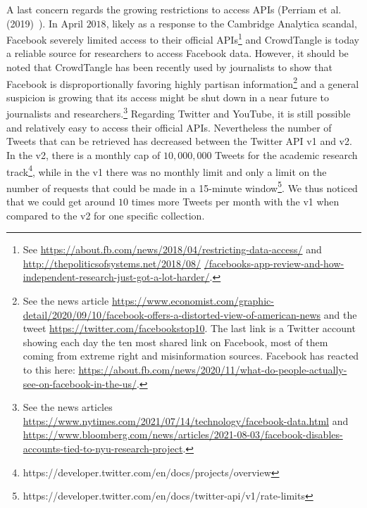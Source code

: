 \documentclass{article}
\begin{document}
A last concern regards the growing restrictions to access APIs (Perriam et al.(2019)~\cite{api}).
In April $2018$, likely as a response to the Cambridge Analytica scandal, Facebook severely limited access to their official APIs\footnote{See \href{https://about.fb.com/news/2018/04/restricting-data-access/}{https://about.fb.com/news/2018/04/restricting-data-access/} and \href{http://thepoliticsofsystems.net/2018/08/facebooks-app-review-and-how-independent-research-just-got-a-lot-harder/}{http://thepoliticsofsystems.net/2018/08/} \href{http://thepoliticsofsystems.net/2018/08/facebooks-app-review-and-how-independent-research-just-got-a-lot-harder/}{/facebooks-app-review-and-how-independent-research-just-got-a-lot-harder/}.} 
and CrowdTangle is today a reliable source for researchers to access Facebook data. 
However, it should be noted that CrowdTangle has been recently used by journalists to show that Facebook is disproportionally favoring highly partisan information\footnote{See the news article \href{https://www.economist.com/graphic-detail/2020/09/10/facebook-offers-a-distorted-view-of-american-news}{https://www.economist.com/graphic-detail/2020/09/10/facebook-offers-a-distorted-view-of-american-news} and the tweet \href{https://twitter.com/facebookstop10}{https://twitter.com/facebookstop10}. 
The last link is a Twitter account showing each day the ten most shared link on Facebook, most of them coming from extreme right and misinformation sources. 
Facebook has reacted to this here: \href{https://about.fb.com/news/2020/11/what-do-people-actually-see-on-facebook-in-the-us/}{https://about.fb.com/news/2020/11/what-do-people-actually-see-on-facebook-in-the-us/}.} 
and a general suspicion is growing that its access might be shut down in a near future to journalists and researchers.\footnote{See the news articles \href{https://www.nytimes.com/2021/07/14/technology/facebook-data.html}{https://www.nytimes.com/2021/07/14/technology/facebook-data.html} and \href{https://www.bloomberg.com/news/articles/2021-08-03/facebook-disables-accounts-tied-to-nyu-research-project}{https://www.bloomberg.com/news/articles/2021-08-03/facebook-disables-accounts-tied-to-nyu-research-project}.}
Regarding Twitter and YouTube, it is still possible and relatively easy to access their official APIs. Nevertheless the number of Tweets that can be retrieved has decreased between the Twitter API v1 and v2. 
In the v2, there is a monthly cap of $10,000,000$ Tweets for the academic research track\footnote{https://developer.twitter.com/en/docs/projects/overview},
while in the v1 there was no monthly limit and only a limit on the number of requests that could be made in a 15-minute window\footnote{https://developer.twitter.com/en/docs/twitter-api/v1/rate-limits}.
We thus noticed that we could get around $10$ times more Tweets per month with the v1 when compared to the v2 for one specific collection.
\end{document}

